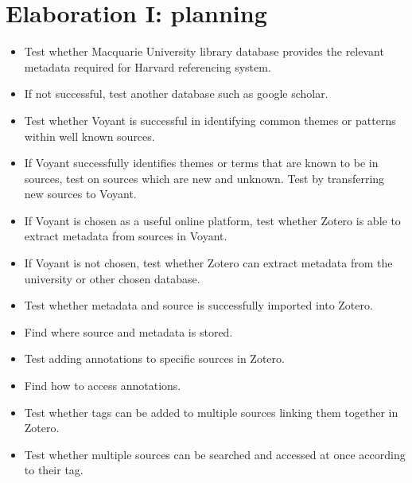 \documentclass{article}
\begin{document}
\section{Elaboration I: planning }
\begin{itemize}
    \item Test whether Macquarie University library database provides the relevant metadata required for Harvard referencing system.
    \item If not successful, test another database such as google scholar. 
    \item Test whether Voyant is successful in identifying common themes or patterns within well known sources. 
    \item If Voyant successfully identifies themes or terms that are known to be in sources, test on sources which are new and unknown. Test by transferring new sources to Voyant.
    \item If Voyant is chosen as a useful online platform, test whether Zotero is able to extract metadata from sources in Voyant.
    \item If Voyant is not chosen, test whether Zotero can extract metadata from the university or other chosen database. 
    \item Test whether metadata and source is successfully imported into Zotero.
    \item Find where source and metadata is stored.
    \item Test adding annotations to specific sources in Zotero.
    \item Find how to access annotations.
    \item Test whether tags can be added to multiple sources linking them together in Zotero.
    \item Test whether multiple sources can be searched and accessed at once according to their tag. 
\end{itemize}
\end{document}
